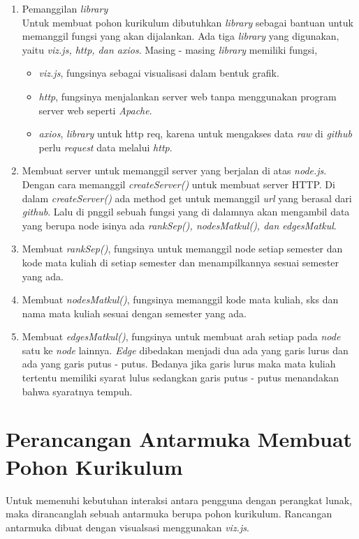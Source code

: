 \begin{enumerate}
\item Pemanggilan \textit{library}\\
Untuk membuat pohon kurikulum dibutuhkan \textit{library} sebagai bantuan untuk memanggil fungsi yang akan dijalankan. Ada tiga \textit{library} yang digunakan, yaitu \textit{viz.js, http, dan axios}. Masing - masing \textit{library} memiliki fungsi,
\begin{itemize}
\item \textit{viz.js}, fungsinya sebagai visualisasi dalam bentuk grafik.
\item \textit{http}, fungsinya menjalankan server web tanpa menggunakan program server web seperti \textit{Apache}. 
\item \textit{axios}, \textit{library} untuk http req, karena untuk mengakses data \textit{raw} di \textit{github} perlu \textit{request} data melalui \textit{http}.
\end{itemize} 
\item Membuat server untuk memanggil server yang berjalan di atas \textit{node.js}. Dengan cara memanggil \textit{createServer()} untuk membuat server HTTP. Di dalam \textit{createServer()} ada method get untuk memanggil \textit{url} yang berasal dari \textit{github}. Lalu di pnggil sebuah fungsi yang di dalamnya akan mengambil data yang berupa node isinya ada \textit{rankSep(), nodesMatkul(), dan edgesMatkul}.
\item Membuat \textit{rankSep()}, fungsinya untuk memanggil node setiap semester dan kode mata kuliah di setiap semester dan menampilkannya sesuai semester yang ada.
\item Membuat \textit{nodesMatkul()}, fungsinya memanggil kode mata kuliah, sks dan nama mata kuliah sesuai dengan semester yang ada. 
\item Membuat \textit{edgesMatkul()}, fungsinya untuk membuat arah setiap pada \textit{node} satu ke \textit{node} lainnya. \textit{Edge} dibedakan menjadi dua ada yang garis lurus dan ada yang garis putus - putus. Bedanya jika garis lurus maka mata kuliah tertentu memiliki syarat lulus sedangkan garis putus - putus menandakan bahwa syaratnya tempuh.

\end{enumerate}


\section{Perancangan Antarmuka Membuat Pohon Kurikulum}
\label{sec: Perancangan Antarmuka Membuat Pohon Kurikulum}
Untuk memenuhi kebutuhan interaksi antara pengguna dengan perangkat lunak, maka dirancanglah sebuah antarmuka berupa pohon kurikulum. Rancangan antarmuka dibuat dengan visualsasi menggunakan \textit{viz.js}. 